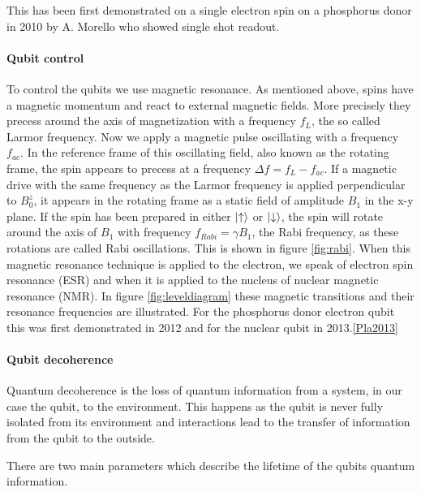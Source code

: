 This has been first demonstrated on a single electron spin on a phosphorus donor in 2010 by A. Morello who showed single shot readout.\cite{Morello2010}

\paragraph*{Qubit control} \label{sec:magRes}
To control the qubits we use magnetic resonance. As mentioned above, spins have a magnetic momentum and react to external magnetic fields. More precisely they precess around the axis of magnetization with a frequency $f_L$, the so called Larmor frequency. Now we apply a magnetic pulse oscillating with a frequency $f_{ac}$. In the reference frame of this oscillating  field, also known as the rotating frame, the spin appears to precess at a frequency $\Delta f=f_L-f_{ac}$.  If a magnetic drive with the same frequency as the Larmor frequency is applied perpendicular to $B_0^z$, it appears in the rotating frame as a static field of amplitude $B_1$ in the x-y plane. If the spin has been prepared in either $\ket{\uparrow}$ or $\ket{\downarrow}$, the spin will rotate around the axis of $B_1$ with frequency $f_{Rabi}=\gamma B_1$, the Rabi frequency, as these rotations are called Rabi oscillations. This is shown in figure \ref{fig:rabi}. 
When this magnetic resonance technique is applied to the electron, we speak of electron spin resonance (ESR) and when it is applied to the nucleus of nuclear magnetic resonance (NMR).
In figure \ref{fig:leveldiagram} these magnetic transitions and their resonance frequencies are illustrated. 
For the phosphorus donor electron qubit this was first demonstrated in 2012\cite{Pla2012} and for the nuclear qubit in 2013.\ref{Pla2013}



\paragraph*{Qubit decoherence} \label{sec:decoherence}

Quantum decoherence is the loss of quantum information from a system, in our case the qubit, to the environment.
This happens as the qubit is never fully isolated from its environment and interactions lead to the transfer of information from the qubit to the outside. 

There are two main parameters which describe the lifetime of the qubits quantum information. 

